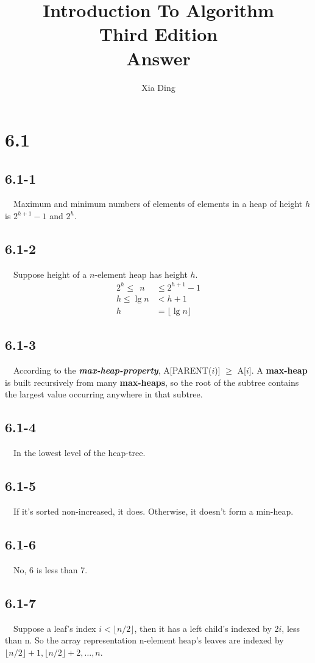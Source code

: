 \documentclass[10pt]{article}
\author{Xia Ding}
\title{\textbf{Introduction To Algorithm}\\Third Edition\\\textbf{Answer}}
\begin{document}
\maketitle
\section*{6.1}
\subsection*{6.1-1}
~~Maximum and minimum numbers of elements of elements in a heap of
height $h$ is $2^{h\!+\!1}-1$ and $2^h$.

\subsection*{6.1-2}
~~Suppose height of a $n$-element heap has height $h$.\\
\begin{align*}
2^h \le~~ n ~&\le 2^{h\!+\!1}-1\\
h \le \lg n &< h + 1\\
 h &= \lfloor {\lg n} \rfloor
\end{align*}


\subsection*{6.1-3}
~~According to the \textbf \textit {max-heap-property},
A[PARENT($i$)] $\ge$ A[$i$]. A \textbf{max-heap} is built
recursively from many \textbf{max-heaps}, so the root of the subtree
contains the largest value occurring anywhere in that subtree.

\subsection*{6.1-4}
~~In the lowest level of the heap-tree.

\subsection*{6.1-5}
~~If it's sorted non-increased, it does. Otherwise, it doesn't form
a min-heap.

\subsection*{6.1-6}
~~No, 6 is less than 7.

\subsection*{6.1-7}
~~Suppose a leaf's index $i < \lfloor {n/2} \rfloor$, then it has a
left child's indexed by 2$i$, less than n. So the array
representation n-element heap's leaves are indexed by
$\lfloor {n/2} \rfloor + 1, \lfloor {n/2} \rfloor +2,\ldots{}, n$.
\end{document}

